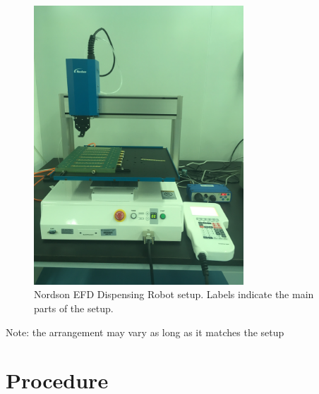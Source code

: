 \documentclass[12pt]{cnihepsop}
\begin{document}
\begin{center}
\begin{figure}[h]
\includegraphics[width=0.7\textwidth]{img/DispensingRobot.jpg}
\caption{Nordson EFD Dispensing Robot setup. Labels indicate the main parts of the setup.}
\end{figure}
\end{center}

Note: the arrangement may vary as long as it matches the setup

\section{Procedure}
\end{document}

